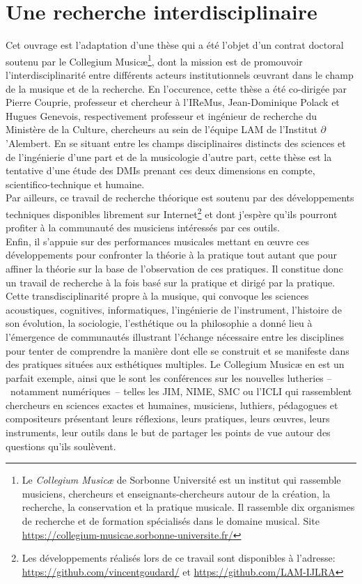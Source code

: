 \section{Une recherche interdisciplinaire}

\noindent Cet ouvrage est l'adaptation d'une thèse qui a été l'objet d'un contrat doctoral soutenu par le Collegium Musicæ\footnote{Le \textit{Collegium Musicæ} de Sorbonne Université est un institut qui rassemble musiciens, chercheurs et enseignants-chercheurs autour de la création, la recherche, la conservation et la pratique musicale. Il rassemble dix organismes de recherche et de formation spécialisés dans le domaine musical. Site \url{https://collegium-musicae.sorbonne-universite.fr/}}, dont la mission est de promouvoir l'interdisciplinarité entre différents acteurs institutionnels œuvrant dans le champ de la musique et de la recherche. En l'occurence, cette thèse a été co-dirigée par Pierre Couprie, professeur et chercheur à l'\gls{IReMus}, Jean-Dominique Polack et Hugues Genevois, respectivement professeur et ingénieur de recherche du Ministère de la Culture, chercheurs au sein de l'équipe \gls{LAM} de l'Institut $\partial$'Alembert. En se situant entre les champs disciplinaires distincts des sciences et de l'ingénierie d'une part et de la musicologie d'autre part, cette thèse est la tentative d'une étude des \glspl{DMI} prenant ces deux dimensions en compte, scientifico-technique et humaine.\\
\indent Par ailleurs, ce travail de recherche théorique est soutenu par des développements techniques disponibles librement sur Internet\footnote{Les développements réalisés lors de ce travail sont disponibles à l'adresse: \url{https://github.com/vincentgoudard/} et \url{https://github.com/LAM-IJLRA}} et dont j'espère qu'ils pourront profiter à la communauté des musiciens intéressés par ces outils.\\
\indent Enfin, il s'appuie sur des performances musicales mettant en œuvre ces développements pour confronter la théorie à la pratique tout autant que pour affiner la théorie sur la base de l'observation de ces pratiques. Il constitue donc un travail de recherche à la fois basé sur la pratique et dirigé par la pratique.\\
\indent Cette transdisciplinarité propre à la musique, qui convoque les sciences acoustiques, cognitives, informatiques, l'ingénierie de l'instrument, l'histoire de son évolution, la sociologie, l'esthétique ou la philosophie a donné lieu à l'émergence de communautés illustrant l'échange nécessaire entre les disciplines pour tenter de comprendre la manière dont elle se construit et se manifeste dans des pratiques situées aux esthétiques multiples. Le Collegium Musicæ en est un parfait exemple, ainsi que le sont les conférences sur les nouvelles lutheries --~notamment numériques~-- telles les \gls{JIM}, \gls{NIME}, \gls{SMC} ou l'\gls{ICLI} qui rassemblent chercheurs en sciences exactes et humaines, musiciens, luthiers, pédagogues et compositeurs présentant leurs réflexions, leurs pratiques, leurs œuvres, leurs instruments, leur outils dans le but de partager les points de vue autour des questions qu'ils soulèvent.


